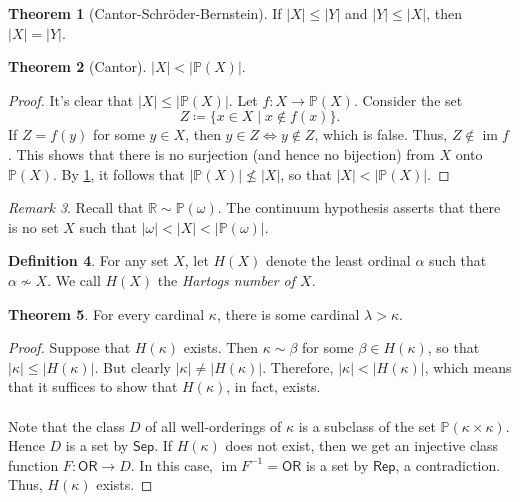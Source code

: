 \documentclass[10pt,letterpaper,cm]{nupset}
\theoremstyle{definition}
\newtheorem{definition}{Definition}[subsection]
\theoremstyle{theorem}
\newtheorem{theorem}[definition]{Theorem}
\theoremstyle{remark}
\newtheorem{remark}[definition]{Remark}
\renewcommand{\P}{\mathbb P}
\newcommand{\R}{\mathbb R}
\newcommand{\1}{\mathbf{1}}
\newcommand{\0}{\vec 0}
\newcommand{\ord}{\mathsf{OR}}
\DeclareMathOperator{\im}{im}
\begin{document}
\begin{theorem}[Cantor-Schr\"oder-Bernstein]\label{CSB}
If $\lvert{X}\rvert\leq \lvert{Y}\rvert$ and $\lvert{Y}\rvert\leq \lvert{X}\rvert$, then $\lvert{X}\rvert = \lvert{Y}\rvert$.
\end{theorem}


\begin{theorem}[Cantor]
$\lvert{X}\rvert < \lvert{\P(X)}\rvert$.
\end{theorem}
\begin{proof}
It's clear that $\lvert{X}\rvert \leq \lvert{\P(X)}\rvert$. Let $f: X \to \P(X)$. Consider the set $$Z\coloneqq \{x\in X \mid x \notin f(x)    \} .$$ If $Z= f(y)$ for some $y\in X$, then $y\in Z \iff y\notin Z$, which is false. Thus, $Z\notin \im{f}$. This shows that there is no surjection (and hence no bijection) from $X$ onto $\P(X)$. By \cref{CSB}, it follows that   $\lvert{\P(X)}\rvert \not \leq \lvert{X}\rvert$, so that $\lvert{X}\rvert < \lvert{\P(X)}\rvert$.
\end{proof}


\begin{remark}
Recall that $\R \sim \P(\omega)$. The continuum hypothesis asserts that there is no set $X$ such that $\lvert{\omega}\rvert < \lvert{X}\rvert < \lvert{\P(\omega)}\rvert$.
\end{remark}

\begin{definition}
For any set $X$, let $H(X)$ denote the least ordinal $\alpha$  such that $\alpha \not \sim X$. We call $H(X)$ the \textit{Hartogs number of $X$}. 
\end{definition}


\begin{theorem}
For every cardinal $\kappa$, there is some cardinal $\lambda > \kappa$.
\end{theorem}
\begin{proof}
Suppose that $H(\kappa)$ exists. Then $\kappa \sim \beta$ for some $ \beta \in H(\kappa) $, so that $\lvert{\kappa}\rvert \leq \lvert{H(\kappa)}\rvert$. But clearly  $\lvert{\kappa}\rvert \ne \lvert{H(\kappa)}\rvert$. Therefore, $\lvert{\kappa}\rvert < \lvert{H(\kappa)}\rvert$, which means that it suffices to show that $H(\kappa)$, in fact, exists.
\\ \\ Note that the class $D$ of all well-orderings of $\kappa$ is a subclass of the set $\P(\kappa \times \kappa)$. Hence $D$ is a set by $\mathsf{Sep}$. If  $H(\kappa)$ does not exist, then we get an injective class function $F: \ord \to D$. In this case, $\im{F^{-1}} = \ord$ is a set by $\mathsf{Rep}$, a contradiction. Thus, $H(\kappa)$ exists. 
\end{proof}
\end{document}
